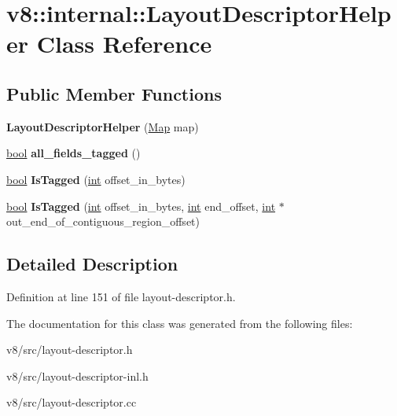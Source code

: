 \hypertarget{classv8_1_1internal_1_1LayoutDescriptorHelper}{}\section{v8\+:\+:internal\+:\+:Layout\+Descriptor\+Helper Class Reference}
\label{classv8_1_1internal_1_1LayoutDescriptorHelper}
\subsection*{Public Member Functions}
\begin{DoxyCompactItemize}
\item 
\mbox{\label{classv8_1_1internal_1_1LayoutDescriptorHelper_ae0b7690f3405fe18c1203f87536fbc27}} 
{\bfseries Layout\+Descriptor\+Helper} (\mbox{\hyperlink{classv8_1_1internal_1_1Map}{Map}} map)
\item 
\mbox{\label{classv8_1_1internal_1_1LayoutDescriptorHelper_a1f485eb7b0e61877d618bfd0b8258736}} 
\mbox{\hyperlink{classbool}{bool}} {\bfseries all\+\_\+fields\+\_\+tagged} ()
\item 
\mbox{\label{classv8_1_1internal_1_1LayoutDescriptorHelper_a3832b13cf57c4c18316b8d9272fa3d19}} 
\mbox{\hyperlink{classbool}{bool}} {\bfseries Is\+Tagged} (\mbox{\hyperlink{classint}{int}} offset\+\_\+in\+\_\+bytes)
\item 
\mbox{\label{classv8_1_1internal_1_1LayoutDescriptorHelper_a5db3e8c7f81db699556171ea1965b8b2}} 
\mbox{\hyperlink{classbool}{bool}} {\bfseries Is\+Tagged} (\mbox{\hyperlink{classint}{int}} offset\+\_\+in\+\_\+bytes, \mbox{\hyperlink{classint}{int}} end\+\_\+offset, \mbox{\hyperlink{classint}{int}} $\ast$out\+\_\+end\+\_\+of\+\_\+contiguous\+\_\+region\+\_\+offset)
\end{DoxyCompactItemize}


\subsection{Detailed Description}


Definition at line 151 of file layout-\/descriptor.\+h.



The documentation for this class was generated from the following files\+:\begin{DoxyCompactItemize}
\item 
v8/src/layout-\/descriptor.\+h\item 
v8/src/layout-\/descriptor-\/inl.\+h\item 
v8/src/layout-\/descriptor.\+cc\end{DoxyCompactItemize}
